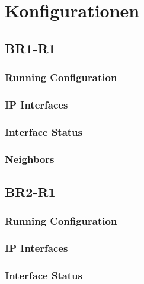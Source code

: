 \appendix

\section{Konfigurationen}
\label{appendix:configurations}

\subsection{BR1-R1}
\subsubsection{Running Configuration}


\subsubsection{IP Interfaces}


\subsubsection{Interface Status}


\subsubsection{Neighbors}


\subsection{BR2-R1}
\subsubsection{Running Configuration}


\subsubsection{IP Interfaces}


\subsubsection{Interface Status}


